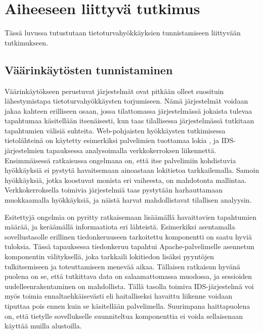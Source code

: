 
\chapter{Aiheeseen liittyvä tutkimus}

Tässä luvussa tutustutaan tietoturvahyökkäyksien tunnistamiseen liittyvään tutkimukseen.

\section{Väärinkäytösten tunnistaminen}

Väärinkäytökseen perustuvat järjestelmät ovat pitkään olleet suosituin lähestymistapa tietoturvahyökkäysten torjumiseen. Nämä järjestelmät voidaan jakaa kahteen erilliseen osaan, jossa tilattomassa 
järjestelmässä jokaista tulevaa tapahtumaa käsitellään itsenäisesti, kun taas tilallisessa järjestelmässä tutkitaan tapahtumien välisiä suhteita. Web-pohjaisten hyökkäysten tutkimisessa tietolähteinä 
on käytetty esimerkiksi palvelimien tuottamaa lokia \cite{LightTool}, ja IDS-järjestelmien \cite{Snort}\cite{Bro} tapauksessa analysoimalla verkkokerroksen liikennettä. Ensimmäisessä ratkaisussa ongelmana
on, että itse palvelimiin kohdistuvia hyökkäyksiä ei pystytä havaitsemaan ainoastaan lokitietoa tarkkailemalla. Samoin hyökkäyksiä, jotka koostuvat monista eri vaiheesta, on mahdotonta mallintaa. 
Verkkokerroksella toimivia järjestelmiä taas pystytään harhauttamaan muokkaamalla hyökkäyksiä, ja näistä harvat mahdollistavat tilallisen analyysin. 

Esitettyjä ongelmia on pyritty ratkaisemaan lisäämällä havaittavien tapahtumien määrää, ja keräämällä informaatiota eri lähteistä. Esimerkiksi asentamalla sovellustasolle erillinen tiedonkeruuseen 
tarkoitettu komponentti \cite{Application} on saatu hyviä tuloksia. Tässä tapauksessa tiedonkeruu tapahtui Apache-palvelimelle asennetun komponentin välityksellä, joka tarkkaili lokitiedon lisäksi
pyyntöjen tulkitsemiseen ja toteuttamiseen menevää aikaa. Tällaisen ratkaisun hyvänä puolena on se, että tutkittava data on salaamattomassa muodossa, ja sessioiden uudelleenrakentaminen on mahdollista. 
Tällä tasolla toimiva IDS-järjestelmä voi myös toimia ennaltaehkäisevästi eli haitalliseksi havaittu liikenne voidaan tiputtaa pois ennen kuin se käsitellään palvelimella. Suurimpana haittapuolena on, 
että tietylle sovellukselle suunniteltua komponenttia ei voida sellaisenaan käyttää muilla alustoilla. 

